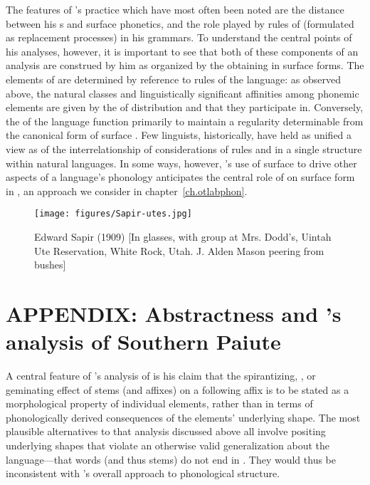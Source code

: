 The features of {\Sapir}'s practice which have most often been noted are
the distance between his s and surface
phonetics, and the role played by rules of  (formulated as
replacement processes) in his grammars. To understand the central
points of his analyses, however, it is important to see that both of
these components of an analysis are construed by him as organized by
the  obtaining in surface forms. The elements of
 are determined by reference to rules of
the language: as observed above, the natural classes and
linguistically significant affinities among phonemic elements are
given by the  of distribution and  that they
participate in. Conversely, the  of the language
function primarily to maintain a regularity determinable from the
canonical form of surface . Few linguists,
historically, have held as unified a view as {\Sapir} of the
interrelationship of considerations of rules and  in a
single structure within natural languages. In some ways, however,
{\Sapir}'s use of surface  to drive other aspects of a
language's phonology anticipates the central role of  on
surface form in , an approach we consider in
chapter~\ref{ch.otlabphon}.

\newpage
\begin{figure}
  \texttt{[image: figures/Sapir-utes.jpg]}
  \caption{Edward Sapir (1909) {[In glasses, with group at
      Mrs. Dodd's, Uintah Ute Reservation, White Rock, Utah.  J. Alden
      Mason peering from bushes]}}
  \label{fig:ch.sapir.sapir_utes}
\end{figure}

\section*{APPENDIX: Abstractness and {\Sapir}'s analysis of Southern
  Paiute}

A central feature of {\Sapir}'s analysis of  is his claim
that the spirantizing, , or geminating effect of stems (and
affixes) on a following affix is to be stated as a morphological
property of individual elements, rather than in terms of
phonologically derived consequences of the elements' underlying
shape.  The most plausible alternatives to that analysis
discussed above all involve positing underlying shapes that violate an
otherwise valid generalization about the language—that words (and thus
stems) do not end in . They would thus be inconsistent with
{\Sapir}'s overall approach to phonological structure.

